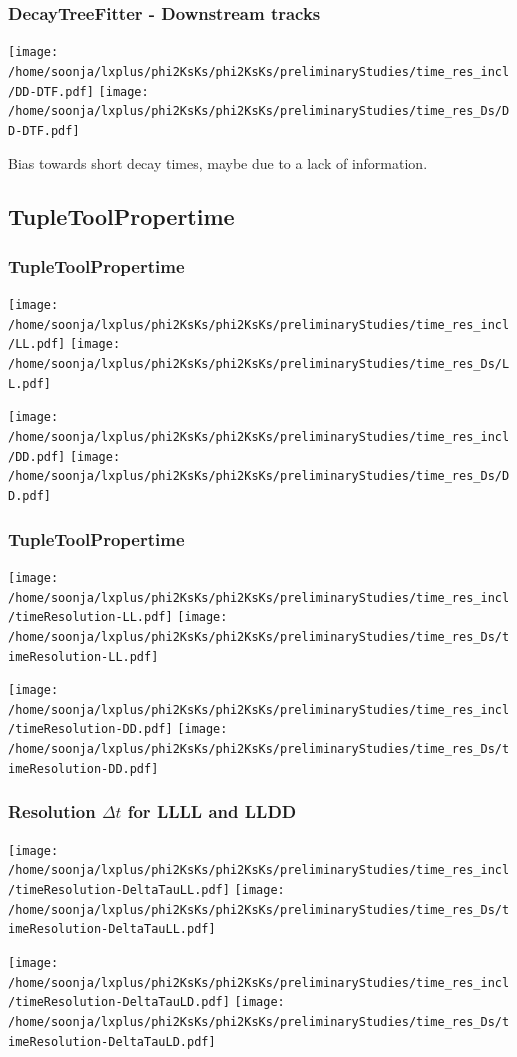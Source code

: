 \documentclass{beamer}
\begin{document}
\begin{frame}
\frametitle{DecayTreeFitter - Downstream tracks}
\begin{center}
\texttt{[image: /home/soonja/lxplus/phi2KsKs/phi2KsKs/preliminaryStudies/time\_res\_incl/DD-DTF.pdf]}
\texttt{[image: /home/soonja/lxplus/phi2KsKs/phi2KsKs/preliminaryStudies/time\_res\_Ds/DD-DTF.pdf]}
\end{center}
Bias towards short decay times, maybe due to a lack of information.
\end{frame}


\subsection{TupleToolPropertime}
\begin{frame}
\frametitle{TupleToolPropertime}
\vspace*{-.4cm}
\begin{center}
\texttt{[image: /home/soonja/lxplus/phi2KsKs/phi2KsKs/preliminaryStudies/time\_res\_incl/LL.pdf]}
\texttt{[image: /home/soonja/lxplus/phi2KsKs/phi2KsKs/preliminaryStudies/time\_res\_Ds/LL.pdf]}

\texttt{[image: /home/soonja/lxplus/phi2KsKs/phi2KsKs/preliminaryStudies/time\_res\_incl/DD.pdf]}
\texttt{[image: /home/soonja/lxplus/phi2KsKs/phi2KsKs/preliminaryStudies/time\_res\_Ds/DD.pdf]}
\end{center}
\end{frame}
\begin{frame}
\frametitle{TupleToolPropertime}
\vspace*{-.4cm}
\begin{center}
\texttt{[image: /home/soonja/lxplus/phi2KsKs/phi2KsKs/preliminaryStudies/time\_res\_incl/timeResolution-LL.pdf]}
\texttt{[image: /home/soonja/lxplus/phi2KsKs/phi2KsKs/preliminaryStudies/time\_res\_Ds/timeResolution-LL.pdf]}

\texttt{[image: /home/soonja/lxplus/phi2KsKs/phi2KsKs/preliminaryStudies/time\_res\_incl/timeResolution-DD.pdf]}
\texttt{[image: /home/soonja/lxplus/phi2KsKs/phi2KsKs/preliminaryStudies/time\_res\_Ds/timeResolution-DD.pdf]}
\end{center}
\end{frame}

\begin{frame}
\frametitle{Resolution $\Delta t$ for LLLL and LLDD}
\vspace*{-.4cm}
\begin{center}
\texttt{[image: /home/soonja/lxplus/phi2KsKs/phi2KsKs/preliminaryStudies/time\_res\_incl/timeResolution-DeltaTauLL.pdf]}
\texttt{[image: /home/soonja/lxplus/phi2KsKs/phi2KsKs/preliminaryStudies/time\_res\_Ds/timeResolution-DeltaTauLL.pdf]}

\texttt{[image: /home/soonja/lxplus/phi2KsKs/phi2KsKs/preliminaryStudies/time\_res\_incl/timeResolution-DeltaTauLD.pdf]}
\texttt{[image: /home/soonja/lxplus/phi2KsKs/phi2KsKs/preliminaryStudies/time\_res\_Ds/timeResolution-DeltaTauLD.pdf]}
\end{center}
\end{frame}
\end{document}
